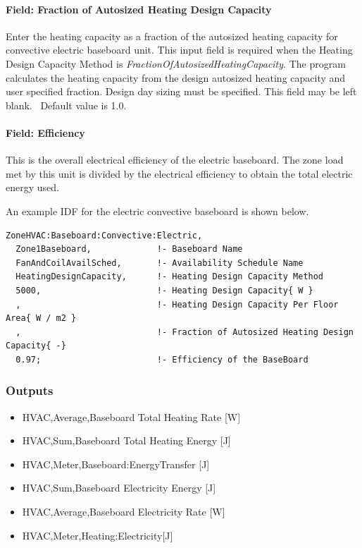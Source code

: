 \paragraph{Field: Fraction of Autosized Heating Design Capacity}\label{field-fraction-of-autosized-heating-design-capacity-4}

Enter the heating capacity as a fraction of the autosized heating capacity for convective electric baseboard unit. This input field is required when the Heating Design Capacity Method is \emph{FractionOfAutosizedHeatingCapacity}. The program calculates the heating capacity from the design autosized heating capacity and user specified fraction. Design day sizing must be specified. This field may be left blank.~ Default value is 1.0.

\paragraph{Field: Efficiency}\label{field-efficiency-1}

This is the overall electrical efficiency of the electric baseboard. The zone load met by this unit is divided by the electrical efficiency to obtain the total electric energy used.

An example IDF for the electric convective baseboard is shown below.

\begin{lstlisting}
ZoneHVAC:Baseboard:Convective:Electric,
  Zone1Baseboard,             !- Baseboard Name
  FanAndCoilAvailSched,       !- Availability Schedule Name
  HeatingDesignCapacity,      !- Heating Design Capacity Method
  5000,                       !- Heating Design Capacity{ W }
  ,                           !- Heating Design Capacity Per Floor Area{ W / m2 }
  ,                           !- Fraction of Autosized Heating Design Capacity{ -}
  0.97;                       !- Efficiency of the BaseBoard
\end{lstlisting}

\subsubsection{Outputs}\label{outputs-4-012}

\begin{itemize}
\item
  HVAC,Average,Baseboard Total Heating Rate {[}W{]}
\item
  HVAC,Sum,Baseboard Total Heating Energy {[}J{]}
\item
  HVAC,Meter,Baseboard:EnergyTransfer {[}J{]}
\item
  HVAC,Sum,Baseboard Electricity Energy {[}J{]}
\item
  HVAC,Average,Baseboard Electricity Rate {[}W{]}
\item
  HVAC,Meter,Heating:Electricity{[}J{]}
\end{itemize}

